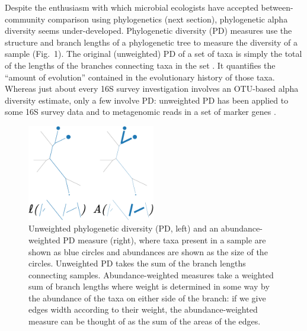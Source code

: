 \documentclass{amsart}
\newcommand{\forarxiv}[1]{#1}
\begin{document}
Despite the enthusiasm with which microbial ecologists have accepted between-community comparison using phylogenetics (next section), phylogenetic alpha diversity seems under-developed.
Phylogenetic diversity (PD) measures use the structure and branch lengths of a phylogenetic tree to measure the diversity of a sample (Fig.~1).
The original (unweighted) PD of a set of taxa is simply the total of the lengths of the branches connecting taxa in the set \citet{faith1992conservation}.
It quantifies the ``amount of evolution'' contained in the evolutionary history of those taxa.
Whereas just about every 16S survey investigation involves an OTU-based alpha diversity estimate, only a few involve PD: unweighted PD has been applied to some 16S survey data \citep{lozupone2007global,costello2009bacterial} and to metagenomic reads in a set of marker genes \citep{kembel2011phylogenetic}.

\newcommand{\pdLegend}{
    Unweighted phylogenetic diversity (PD, left) and an abundance-weighted PD measure (right), where taxa present in a sample are shown as blue circles and abundances are shown as the size of the circles.
    Unweighted PD takes the sum of the branch lengths connecting samples.
    Abundance-weighted measures take a weighted sum of branch lengths where weight is determined in some way by the abundance of the taxa on either side of the branch: if we give edges width according to their weight, the abundance-weighted measure can be thought of as the sum of the areas of the edges.
}
\forarxiv{
\begin{figure}
  \vspace{-14pt}
  \begin{center}
    \includegraphics[width=2.2in]{figures/pd.pdf}
  \end{center}
  \vspace{-10pt}
  \caption{\pdLegend}
  \label{fig:pd}
\end{figure}
}
\end{document}
